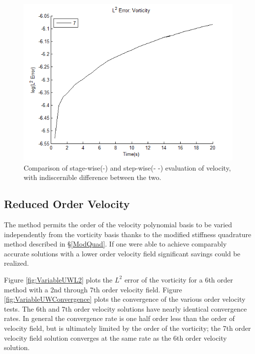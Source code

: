 \documentclass[letterpaper,12pt]{report}
\begin{document}
\begin{figure}
\centering
\includegraphics[width=1\textwidth]{StageVSStep.PNG}
\caption{\label{fig:StageVSStep}Comparison of stage-wise(-) and step-wise(- -) evaluation of velocity, with indiscernible difference between the two.}
\end{figure}

%
\subsection{Reduced Order Velocity}
The method permits the order of the velocity polynomial basis to be varied independently from the vorticity basis thanks to the modified stiffness quadrature method described in \S \ref{ModQuad}. If one were able to achieve comparably accurate solutions with a lower order velocity field significant savings could be realized.

Figure \ref{fig:VariableUWL2} plots the $L^2$ error of the vorticity for a 6th order method with a 2nd through 7th order velocity field. Figure \ref{fig:VariableUWConvergence} plots the convergence of the various order velocity tests. The 6th and 7th order velocity solutions have nearly identical convergence rates. In general the convergence rate is one half order less than the order of velocity field, but is ultimately limited by the order of the vorticity; the 7th order velocity field solution converges at the same rate as the 6th order velocity solution.
\end{document}
